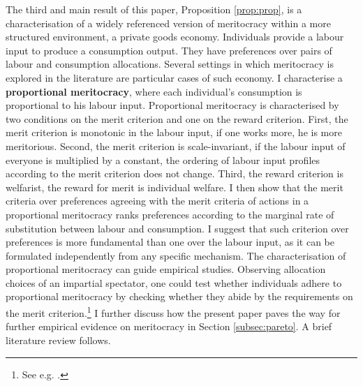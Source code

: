 The third and main result of this paper, Proposition \ref{prop:prop}, is a characterisation of a widely referenced version of meritocracy within a more structured environment, a private goods economy. Individuals provide a labour input to produce a consumption output. They have preferences over pairs of labour and consumption allocations. Several settings in which meritocracy is explored in the literature are particular cases of such economy. I characterise a \textbf{proportional meritocracy}, where each individual's consumption is proportional to his labour input. Proportional meritocracy is characterised by two conditions on the merit criterion and one on the reward criterion. First, the merit criterion is monotonic in the labour input, if one works more, he is more meritorious. Second, the merit criterion is scale-invariant, if the labour input of everyone is multiplied by a constant, the ordering of labour input profiles according to the merit criterion does not change. Third, the reward criterion is welfarist, the reward for merit is individual welfare. I then show that the merit criteria over preferences agreeing with the merit criteria of actions in a proportional meritocracy ranks preferences according to the marginal rate of substitution between labour and consumption. I suggest that such criterion over preferences is more fundamental than one over the labour input, as it can be formulated independently from any specific mechanism. The characterisation of proportional meritocracy can guide empirical studies. Observing allocation choices of an impartial spectator, one could test whether individuals adhere to proportional meritocracy by checking whether they abide by the requirements on the merit criterion.\footnote{See e.g. \cite{cappelenFairnessLimitedInformation2024}.} I further discuss how the present paper paves the way for further empirical evidence on meritocracy in Section \ref{subsec:pareto}. A brief literature review follows.

